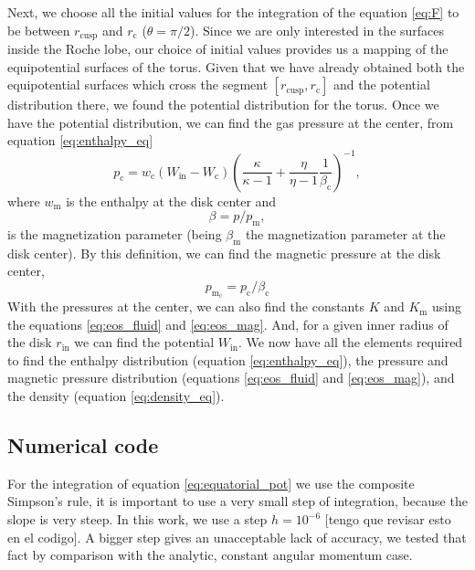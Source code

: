 \documentclass{aa}
\begin{document}
Next, we choose all the initial values for the integration of the equation \eqref{eq:F} to be between $r_{\mathrm{cusp}}$ and $r_{\mathrm{c}}$ ($\theta = \pi / 2$). Since we are only interested in the surfaces inside the Roche lobe, our choice of initial values provides us a mapping of the equipotential surfaces of the torus. Given that we have already obtained both the equipotential surfaces which cross the segment $[r_{\mathrm{cusp}}, r_{\mathrm{c}}]$ and the potential distribution there, we found the potential distribution for the torus.
Once we have the potential distribution, we can find the gas pressure at the center, from equation \eqref{eq:enthalpy_eq}
\begin{equation}
p_{\mathrm{c}} = w_{\mathrm{c}}(W_{\mathrm{in}} - W_{\mathrm{c}})\left(\frac{\kappa}{\kappa - 1} + \frac{\eta}{\eta - 1}\frac{1}{\beta_{\mathrm{c}}}\right)^{-1},
\end{equation}
where $w_{\mathrm{m}}$ is the enthalpy at the disk center and
\begin{equation}\label{eq:beta_eq}
\beta = p/p_{\mathrm{m}},
\end{equation}
is the magnetization parameter (being $\beta_{\mathrm{m}}$ the magnetization parameter at the disk center). By this definition, we can find the magnetic pressure at the disk center,
\begin{equation}
p_{\mathrm{m_{\mathrm{c}}}} = p_{\mathrm{c}}/\beta_{\mathrm{c}}
\end{equation}
With the pressures at the center, we can also find the constants $K$ and $K_{\mathrm{m}}$ using the equations \eqref{eq:eos_fluid} and \eqref{eq:eos_mag}. And, for a given inner radius of the disk $r_{\mathrm{in}}$ we can find the potential $W_{\mathrm{in}}$. We now have all the elements required to find the enthalpy distribution (equation \eqref{eq:enthalpy_eq}), the pressure and magnetic pressure distribution (equations \eqref{eq:eos_fluid} and \eqref{eq:eos_mag}), and the density (equation \eqref{eq:density_eq}).

\subsection{Numerical code}

For the integration of equation \eqref{eq:equatorial_pot} we use the composite Simpson's rule, it is important to use a very small step of integration, because the slope is very steep. In this work, we use a step $h = 10^{-6}$ [tengo que revisar esto en el codigo]. A bigger step gives an unacceptable lack of accuracy, we tested that fact by comparison with the analytic, constant angular momentum case.
\end{document}
